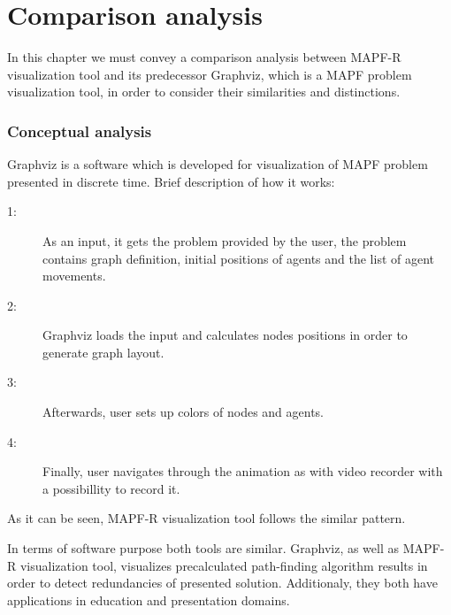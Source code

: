 \documentclass[thesis=B,english]{FITthesis}[2019/12/23]
\begin{document}
\chapter{Comparison analysis}

In this chapter we must convey a comparison analysis between MAPF-R visualization tool and its predecessor Graphviz, which is a MAPF problem visualization tool, in order to consider their similarities and distinctions. 

\subsection{Conceptual analysis}

Graphviz is a software which is developed for visualization of MAPF problem presented in discrete time. Brief description of how it works:

\begin{description}
\item [1:]  As an input, it gets the problem provided by the user, the problem contains graph definition, initial positions of agents and the list of agent movements. 
\item [2:] Graphviz loads the input and calculates nodes positions in order to generate graph layout. 
\item [3:] Afterwards, user sets up colors of nodes and agents. 
\item [4:] Finally, user navigates through the animation as with video recorder with a possibillity to record it. 
\end{description}
As it can be seen, MAPF-R visualization tool follows the similar pattern.   


In terms of software purpose both tools are similar. Graphviz, as well as MAPF-R visualization tool, visualizes precalculated path-finding algorithm results in order to detect redundancies of presented solution. Additionaly, they both have applications in education and presentation domains.
\end{document}
